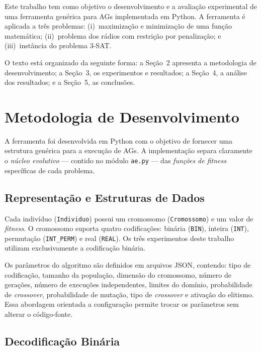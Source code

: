 \documentclass[12pt,twocolumn]{article}
\begin{document}
Este trabalho tem como objetivo o desenvolvimento e a avaliação experimental de uma
ferramenta genérica para AGs implementada em Python. A ferramenta é aplicada a três
problemas: (i)~maximização e minimização de uma função matemática; (ii)~problema dos
rádios com restrição por penalização; e (iii)~instância do problema 3-SAT.

O texto está organizado da seguinte forma: a Seção~2 apresenta a metodologia de
desenvolvimento; a Seção~3, os experimentos e resultados; a Seção~4, a análise dos
resultados; e a Seção~5, as conclusões.

\section{Metodologia de Desenvolvimento}

A ferramenta foi desenvolvida em Python com o objetivo de fornecer uma estrutura
genérica para a execução de AGs. A implementação separa claramente o \textit{núcleo
evolutivo} --- contido no módulo \texttt{ae.py} --- das \textit{funções de fitness}
específicas de cada problema.

\subsection{Representação e Estruturas de Dados}

Cada indivíduo (\texttt{Individuo}) possui um cromossomo (\texttt{Cromossomo}) e um valor
de \textit{fitness}. O cromossomo suporta quatro codificações: binária (\texttt{BIN}),
inteira (\texttt{INT}), permutação (\texttt{INT\_PERM}) e real (\texttt{REAL}). Os três
experimentos deste trabalho utilizam exclusivamente a codificação binária.

Os parâmetros do algoritmo são definidos em arquivos JSON, contendo: tipo de codificação,
tamanho da população, dimensão do cromossomo, número de gerações, número de execuções
independentes, limites do domínio, probabilidade de \textit{crossover}, probabilidade de
mutação, tipo de \textit{crossover} e ativação do elitismo. Essa abordagem orientada a
configuração permite trocar os parâmetros sem alterar o código-fonte.

\subsection{Decodificação Binária}
\end{document}
